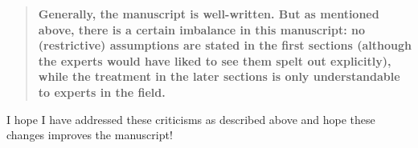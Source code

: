 \documentclass[10pt,parskip=full,foldmarks=off,addrfield=off,backaddress=false,refline=dateleft,letterpaper]{scrlttr2}
\newenvironment{reviewerquote}{\begin{quote}\color{DarkBlue}\bfseries}{\end{quote}}
\begin{document}
\begin{letter}
\begin{reviewerquote}
Generally, the manuscript is well-written. But as mentioned above, there is a certain imbalance in this manuscript: no (restrictive) assumptions are stated in the first sections (although the experts would have liked to see them spelt out explicitly), while the treatment in the later sections is only understandable to experts in the field.
\end{reviewerquote}

I hope I have addressed these criticisms as described above and hope these changes improves the manuscript!

\end{letter}
\end{document}
